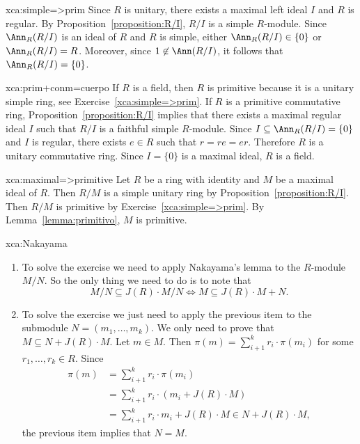 \begin{sol}{xca:simple=>prim} 
	Since $R$ is unitary, there exists a maximal left ideal $I$ and $R$ is regular.
	By Proposition~\ref{proposition:R/I}, $R/I$ is a simple $R$-module. 
	Since $\Ann_R(R/I)$ is an ideal of $R$ and $R$ is simple, either $\Ann_R(R/I)\in\{0\}$ or 
	$\Ann_R(R/I)=R$. Moreover, since 
	$1\not\in\Ann(R/I)$, it follows that 
	$\Ann_R(R/I)=\{0\}$. 
\end{sol}

\begin{sol}{xca:prim+conm=cuerpo}
	If $R$ is a field, then $R$ is primitive because it is a unitary simple ring, see  
	Exercise~\ref{xca:simple=>prim}. If $R$ is a primitive commutative ring, Proposition~\ref{proposition:R/I} implies that there exists a maximal regular ideal $I$
	such that  
	$R/I$ is a faithful simple $R$-module. 
	Since $I\subseteq \Ann_R(R/I)=\{0\}$ and $I$ is regular, there exists $e\in R$ such that 
	$r=re=er$. Therefore $R$ is a unitary commutative ring. Since $I=\{0\}$ is a maximal ideal, 
	$R$ is a field. 
\end{sol}

\begin{sol}{xca:maximal=>primitive}
	Let $R$ be a ring with identity and $M$ be a maximal ideal of $R$. Then 
	$R/M$ is a simple unitary ring by 
	Proposition~\ref{proposition:R/I}. Then $R/M$ is primitive by
	Exercise~\ref{xca:simple=>prim}. By Lemma~\ref{lemma:primitivo}, 
	$M$ is primitive. 
\end{sol}

\begin{sol}{xca:Nakayama}\
\begin{enumerate}
    \item To solve the exercise we need to apply Nakayama's lemma to the $R$-module $M/N$. 
        So the only thing we need to do is to note that 
        \[
        M/N\subseteq J(R)\cdot M/N\Longleftrightarrow M\subseteq J(R)\cdot M+N.
        \]
    \item To solve the exercise we just need to apply the previous item to the submodule $N=(m_1,\dots,m_k)$. 
    We only need to 
    prove that 
    $M\subseteq N+J(R)\cdot M$. Let $m\in M$. Then $\pi(m)=\sum_{i+1}^kr_i\cdot\pi(m_i)$ 
    for some $r_1,\dots,r_k\in R$. Since
    \begin{align*}
      \pi(m)&=\sum_{i+1}^kr_i\cdot\pi(m_i)\\
    &=\sum_{i+1}^kr_i\cdot (m_i+J(R)\cdot M)\\
    &=\sum_{i+1}^kr_i\cdot m_i+J(R)\cdot M\in N+J(R)\cdot M,
    \end{align*}
    the previous item implies that $N=M$. 
\end{enumerate}
\end{sol}

